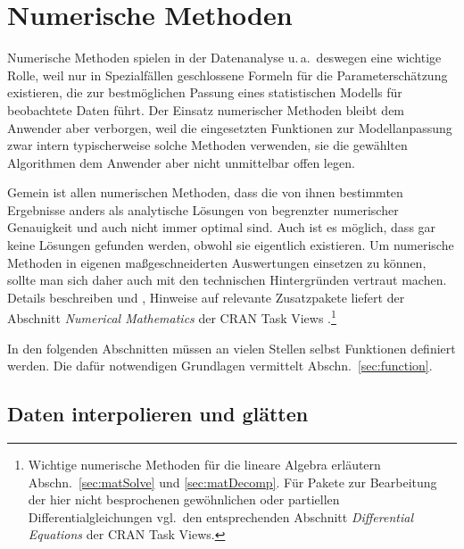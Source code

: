 \chapter{Numerische Methoden}
\label{sec:numerical}

Numerische Methoden spielen in der Datenanalyse u.\,a.\ deswegen eine wichtige Rolle, weil nur in Spezialfällen geschlossene Formeln für die Parameterschätzung existieren, die zur bestmöglichen Passung eines statistischen Modells für beobachtete Daten führt. Der Einsatz numerischer Methoden bleibt dem Anwender aber verborgen, weil die eingesetzten Funktionen zur Modellanpassung zwar intern typischerweise solche Methoden verwenden, sie die gewählten Algorithmen dem Anwender aber nicht unmittelbar offen legen.

Gemein ist allen numerischen Methoden, dass die von ihnen bestimmten Ergebnisse anders als analytische Lösungen von begrenzter numerischer Genauigkeit und auch nicht immer optimal sind. Auch ist es möglich, dass gar keine Lösungen gefunden werden, obwohl sie eigentlich existieren. Um numerische Methoden in eigenen maßgeschneiderten Auswertungen einsetzen zu können, sollte man sich daher auch mit den technischen Hintergründen vertraut machen. Details beschreiben  und , Hinweise auf relevante Zusatzpakete liefert der Abschnitt \emph{Numerical Mathematics} der CRAN Task Views \cite{CRANtvNumerical}.\footnote{Wichtige numerische Methoden für die lineare Algebra erläutern Abschn.\ \ref{sec:matSolve} und \ref{sec:matDecomp}. Für Pakete zur Bearbeitung der hier nicht besprochenen gewöhnlichen oder partiellen Differentialgleichungen vgl.\ den entsprechenden Abschnitt \emph{Differential Equations} \cite{CRANtvDiffEq} der CRAN Task Views.}

In den folgenden Abschnitten müssen an vielen Stellen selbst Funktionen definiert werden. Die dafür notwendigen Grundlagen vermittelt Abschn.\ \ref{sec:function}.

\section{Daten interpolieren und glätten}
\label{sec:interpolate}

